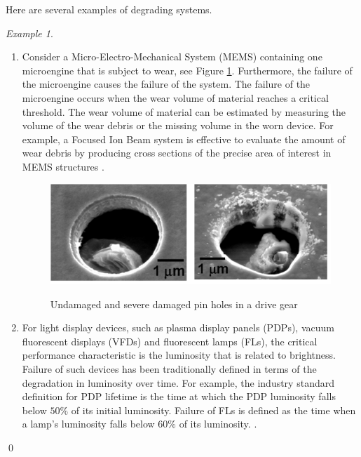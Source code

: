 \documentclass[10pt,a4paper]{article}
\theoremstyle{remark}
\newtheorem{example}{Example}
\begin{document}
Here are several examples of degrading systems.

\begin{example}\label{ex:Degradation1} \renewcommand{\qedsymbol}{$\lozenge$} \mbox{}  

\begin{enumerate}
\item Consider a Micro-Electro-Mechanical System (MEMS) containing one microengine that is subject to wear, see Figure \ref{pic:degradation2}.  Furthermore, the failure of the microengine causes the failure of the system.  The failure of the microengine occurs when the wear volume of material reaches a critical threshold.  The wear volume of material can be estimated by measuring the volume of the wear debris or the missing volume in the worn device.  For example, a Focused Ion Beam system is effective to evaluate the amount of wear debris by producing cross sections of the precise area of interest in MEMS structures \cite{PengFengCoit09}.

\begin{figure}[h!!!]  %
  \centering
  \includegraphics[width=6in]{Degradation2.png}\\
  \footnotesize
  \caption{ \footnotesize{Undamaged and severe damaged pin holes in a drive gear} }\label{pic:degradation2}
\end{figure}

\item For light display devices, such as plasma display panels (PDPs), vacuum fluorescent displays (VFDs) and fluorescent lamps (FLs), the critical performance characteristic is the luminosity that is related to brightness. Failure of such devices has been traditionally defined in terms of the degradation in luminosity over time. For example, the industry standard definition for PDP lifetime is the time at which the PDP luminosity falls below $50\%$ of its initial luminosity. Failure of FLs is defined as the time when a lamp’s luminosity falls below $60\%$ of its luminosity. \cite{FengPengCoit10}.

\end{enumerate}
\qed
\end{example}
  
\end{document}
